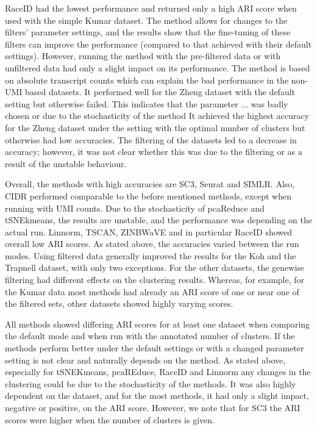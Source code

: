\documentclass[12pt, a4paper]{article}\usepackage[]{graphicx}\usepackage[]{color}
\begin{document}
RaceID had the lowest performance and returned only a high ARI score when used with the simple Kumar dataset. The method allows for changes to the filters’ parameter settings, and the results show that the fine-tuning of these filters can improve the performance (compared to that achieved with their default settings). However, running the method with the pre-filtered data or with unfiltered data had only a slight impact on its performance. The method is based on absolute transcript counts which can explain the bad performance in the non-UMI based datasets. It performed well for the Zheng dataset with the default setting but otherwise failed. This indicates that the parameter ... was badly chosen or due to the stochasticity of the method
It achieved the highest accuracy for the Zheng dataset under the setting with the optimal number of clusters but otherwise had low accuracies. The filtering of the datasets led to a decrease in accuracy; however, it was not clear whether this was due to the filtering or as a result of the unstable behaviour. 


Overall, the methods with high accuracies are SC3, Seurat and SIMLR. Also, CIDR performed comparable to the before mentioned methods, except when running with UMI counts. Due to the stochasticity of pcaReduce and tSNEkmeans, the results are unstable, and the performance was depending on the actual run. Linnorm, TSCAN, ZINBWaVE and in particular RaceID showed overall low ARI scores.
As stated above, the accuracies varied between the run modes. Using filtered data generally improved the results for the Koh and the Trapnell dataset, with only two exceptions. For the other datasets, the genewise filtering had different effects on the clustering results. Whereas, for example, for the Kumar data most methods had already an ARI score of one or near one of the filtered sets, other datasets showed highly varying scores. 


All methods showed differing ARI scores for at least one dataset when comparing the default mode and when run with the annotated number of clusters. If the methods perform better under the default settings or with a changed parameter setting is not clear and naturally depends on the method. As stated above, especially for tSNEKmeans, pcaREduce, RaceID and Linnorm any changes in the clustering could be due to the stochasticity of the methods. It was also highly dependent on the dataset, and for the most methods, it had only a slight impact, negative or positive, on the ARI score. 
However, we note that for SC3 the ARI scores were higher when the number of clusters is given. 
 
\end{document}

